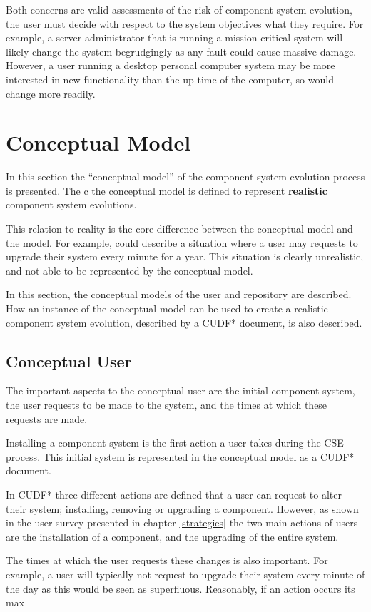 Both concerns are valid assessments of the risk of component system evolution, the user must decide with respect to the system objectives what they require. 
For example, a server administrator that is running a mission critical system will likely change the system begrudgingly as any fault could cause massive damage.
However, a user running a desktop personal computer system may be more interested in new functionality than the up-time of the computer, so would change more readily.

\section{Conceptual Model}
In this section the ``conceptual model'' of the component system evolution process is presented.
The c the conceptual model is defined to represent \textbf{realistic} component system evolutions.

This relation to reality is the core difference between the conceptual model and the \modelname model.
For example, \modelname could describe a situation where a user may requests to upgrade their system every minute for a year.
This situation is clearly unrealistic, and not able to be represented by the conceptual model.

In this section, the conceptual models of the user and repository are described.
How an instance of the conceptual model can be used to create a realistic component system evolution, described by a CUDF* document, is also described.

\subsection{Conceptual User}
The important aspects to the conceptual user are the initial component system, the user requests to be made to the system, and the times at which these requests are made. 

Installing a component system is the first action a user takes during the CSE process.
This initial system is represented in the conceptual model as a CUDF* document.

In CUDF* three different actions are defined that a user can request to alter their system; installing, removing or upgrading a component.
However, as shown in the user survey presented in chapter \ref{strategies} the two main actions of users are the installation of a component, and the upgrading of the entire system.

The times at which the user requests these changes is also important.
For example, a user will typically not request to upgrade their system every minute of the day as this would be seen as superfluous.
Reasonably, if an action occurs its max

